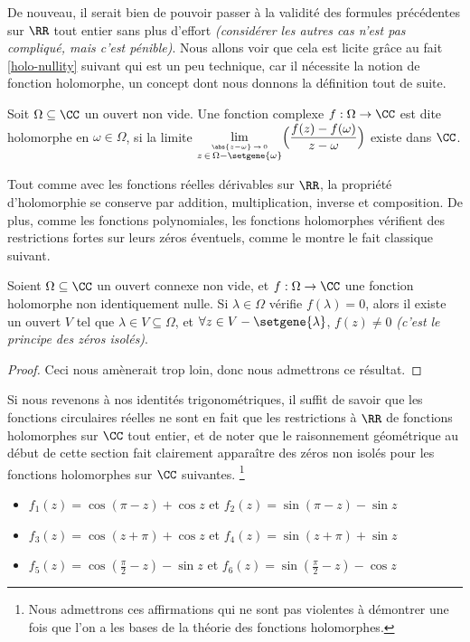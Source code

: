 De nouveau, il serait bien de pouvoir passer à la validité des formules précédentes sur $\RR$ tout entier sans plus d'effort \emph{(considérer les autres cas n'est pas compliqué, mais c'est pénible)}.
%
Nous allons voir que cela est licite grâce au fait \ref{holo-nullity} suivant qui est un peu technique, car il nécessite la notion de fonction holomorphe, un concept dont nous donnons la définition tout de suite.


\begin{defi}
    Soit $\Omega \subseteq \CC$ un ouvert non vide.
	Une fonction complexe $f: \Omega \rightarrow \CC$ est dite holomorphe en $\omega \in \Omega$, 
	si la limite 
	$\displaystyle \lim_{\stackrel{\abs{z - \omega} \, \rightarrow \, 0}{z \, \in \, \Omega - \setgene{\omega}}}\!\Big( \frac{f(z) - f(\omega)}{z - \omega} \Big)$
	existe dans $\CC$.
\end{defi}


\medskip

Tout comme avec les fonctions réelles dérivables sur $\RR$, la propriété d'holomorphie se conserve par addition, multiplication, inverse et composition.
De plus, comme les fonctions polynomiales, les fonctions holomorphes vérifient des restrictions fortes sur leurs zéros éventuels, comme le montre le fait classique suivant.

\begin{fact} \label{holo-nullity}
    Soient $\Omega \subseteq \CC$ un ouvert connexe non vide,
    et
    $f: \Omega \rightarrow \CC$ une fonction holomorphe non identiquement nulle.
	Si $\lambda \in \Omega$ vérifie $f(\lambda) = 0$,
	alors il existe un ouvert $V$ tel que 
	$\lambda \in V \subseteq \Omega$,
	et
	$\forall z \in V - \setgene{\lambda}$, $f(z) \neq 0$ 
	\emph{(c'est le principe des zéros isolés)}. 
\end{fact}


\begin{proof}
	Ceci nous amènerait trop loin, donc nous admettrons ce résultat.
\end{proof}


Si nous revenons à nos identités trigonométriques, il suffit de savoir que les fonctions circulaires réelles ne sont en fait que les restrictions à $\RR$ de fonctions holomorphes sur $\CC$ tout entier, et de noter que le raisonnement géométrique au début de cette section fait clairement apparaître des zéros non isolés pour les fonctions holomorphes sur $\CC$ suivantes.%
\footnote{
	Nous admettrons ces affirmations qui ne sont pas violentes à démontrer une fois que l'on a les bases de la théorie des fonctions holomorphes.
}
%
\begin{itemize}[label=\small\textbullet]
	\item $f_1(z) = \cos (\pi - z) + \cos z$ 
	   et $f_2(z) = \sin (\pi - z) - \sin z$ 

	\smallskip
	\item $f_3(z) =\cos (z + \pi) + \cos z$ 
	   et $f_4(z) =\sin (z + \pi) + \sin z$

	\smallskip
	\item $f_5(z) =\cos \left( \frac{\pi}{2} - z \right) - \sin z$ 
	   et $f_6(z) =\sin \left( \frac{\pi}{2} - z \right) - \cos z$ 
\end{itemize}


